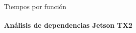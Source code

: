  
\begin{frame}{Tiempos por función}
\framesubtitle{Análisis de dependencias Jetson TX2}
\centering
\res
\end{frame}
